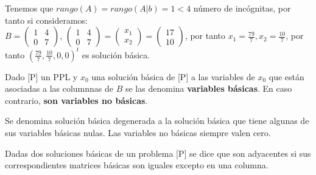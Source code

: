 \documentclass[11pt,fleqn]{book} %
\begin{document}
Tenemos que $rango(A)=rango(A | b)=1<4$ número de incógnitas, por tanto si consideramos: \\
$B=\left(\begin{array}{cc}
1&4\\
0&7
\end{array}\right)$, $\left(\begin{array}{cc}
1&4\\
0&7
\end{array}\right)=\left(\begin{array}{c}
x_1 \\
x_2
\end{array}\right)=\left(\begin{array}{c}
17 \\ 10
\end{array}\right)$, por tanto $x_1=\frac{79}{7}, x_2=\frac{10}{7}$, por tanto $(\frac{79}{7}, \frac{10}{7},0,0)^t$ es solución básica. \\
\begin{definition}
	Dado [P] un PPL y $x_0$ una solución básica de [P] a las variables de $x_0$ que están asociadas a las columnnas de $B$ se las denomina \textbf{variables básicas}. En caso contrario, \textbf{son variables no básicas}.
\end{definition}
\begin{definition}
	Se denomina solución básica degenerada a la solución básica que tiene algunas de sus variables básicas nulas. Las variables no básicas siempre valen cero.
\end{definition}
\begin{definition}
	Dadas dos soluciones básicas de un problema [P] se dice que son adyacentes si sus correspondientes matrices básicas son iguales excepto en una columna.
\end{definition}
\end{document}
